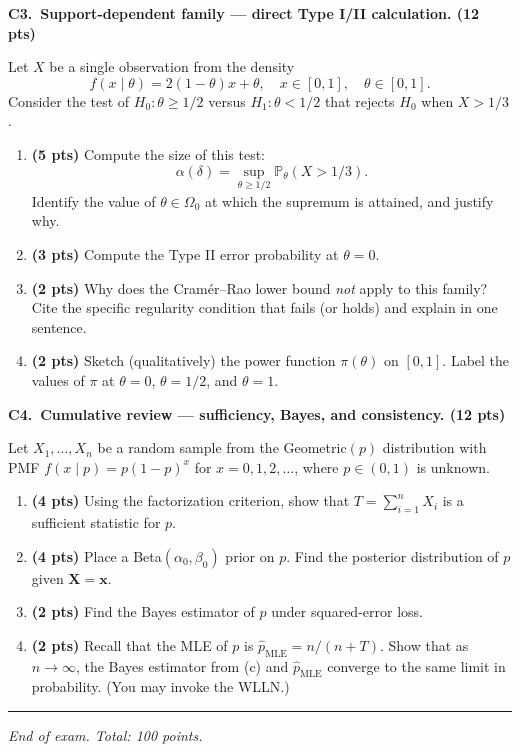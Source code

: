 \documentclass[11pt]{article}
\begin{document}
\vspace{0.6em}

\textbf{C3.\ Support-dependent family --- direct Type I/II calculation. (12 pts)}

Let $X$ be a single observation from the density
\[
    f(x \mid \theta) = 2(1 - \theta)x + \theta, \quad x \in [0, 1], \quad \theta \in [0, 1].
\]
Consider the test of $H_0\!: \theta \ge 1/2$ versus $H_1\!: \theta < 1/2$ that rejects $H_0$ when $X > 1/3$.

\begin{enumerate}[label=(\alph*), leftmargin=*]
    \item \textbf{(5 pts)} Compute the size of this test:
    \[
        \alpha(\delta) = \sup_{\theta \ge 1/2} \mathbb{P}_\theta(X > 1/3).
    \]
    Identify the value of $\theta \in \Omega_0$ at which the supremum is attained, and justify why.
    \item \textbf{(3 pts)} Compute the Type II error probability at $\theta = 0$.
    \item \textbf{(2 pts)} Why does the Cram\'er--Rao lower bound \emph{not} apply to this family? Cite the specific regularity condition that fails (or holds) and explain in one sentence.
    \item \textbf{(2 pts)} Sketch (qualitatively) the power function $\pi(\theta)$ on $[0,1]$. Label the values of $\pi$ at $\theta = 0$, $\theta = 1/2$, and $\theta = 1$.
\end{enumerate}

\vspace{0.6em}

\textbf{C4.\ Cumulative review --- sufficiency, Bayes, and consistency. (12 pts)}

Let $X_1, \dots, X_n$ be a random sample from the Geometric$(p)$ distribution with PMF $f(x\mid p) = p(1-p)^x$ for $x = 0, 1, 2, \dots$, where $p \in (0, 1)$ is unknown.

\begin{enumerate}[label=(\alph*), leftmargin=*]
    \item \textbf{(4 pts)} Using the factorization criterion, show that $T = \sum_{i=1}^n X_i$ is a sufficient statistic for $p$.
    \item \textbf{(4 pts)} Place a Beta$(\alpha_0, \beta_0)$ prior on $p$. Find the posterior distribution of $p$ given $\mathbf{X} = \mathbf{x}$.
    \item \textbf{(2 pts)} Find the Bayes estimator of $p$ under squared-error loss.
    \item \textbf{(2 pts)} Recall that the MLE of $p$ is $\widehat{p}_{\text{MLE}} = n / (n + T)$. Show that as $n \to \infty$, the Bayes estimator from (c) and $\widehat{p}_{\text{MLE}}$ converge to the same limit in probability. (You may invoke the WLLN.)
\end{enumerate}

\vspace{1em}
\hrule
\vspace{0.4em}
\begin{center}
\emph{End of exam. Total: 100 points.}
\end{center}
\end{document}
